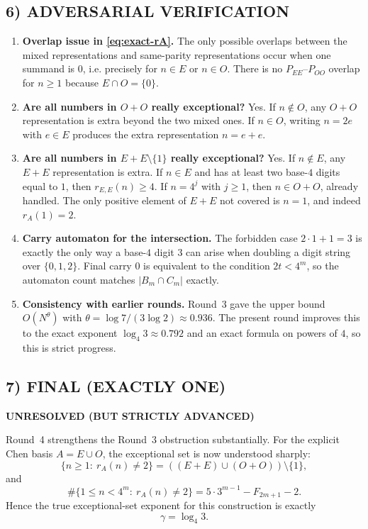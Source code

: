 \subsection*{6) ADVERSARIAL VERIFICATION}
\begin{enumerate}
\item \textbf{Overlap issue in \eqref{eq:exact-rA}.} The only possible overlaps between the mixed representations and same-parity representations occur when one summand is \(0\), i.e. precisely for \(n\in E\) or \(n\in O\). There is no \(P_{EE}\)--\(P_{OO}\) overlap for \(n\ge 1\) because \(E\cap O=\{0\}\).
\item \textbf{Are all numbers in \(O+O\) really exceptional?} Yes. If \(n\notin O\), any \(O+O\) representation is extra beyond the two mixed ones. If \(n\in O\), writing \(n=2e\) with \(e\in E\) produces the extra representation \(n=e+e\).
\item \textbf{Are all numbers in \(E+E\setminus\{1\}\) really exceptional?} Yes. If \(n\notin E\), any \(E+E\) representation is extra. If \(n\in E\) and has at least two base-\(4\) digits equal to \(1\), then \(r_{E,E}(n)\ge 4\). If \(n=4^j\) with \(j\ge 1\), then \(n\in O+O\), already handled. The only positive element of \(E+E\) not covered is \(n=1\), and indeed \(r_A(1)=2\).
\item \textbf{Carry automaton for the intersection.} The forbidden case \(2\cdot 1+1=3\) is exactly the only way a base-\(4\) digit \(3\) can arise when doubling a digit string over \(\{0,1,2\}\). Final carry \(0\) is equivalent to the condition \(2t<4^m\), so the automaton count matches \(|B_m\cap C_m|\) exactly.
\item \textbf{Consistency with earlier rounds.} Round~3 gave the upper bound \(O(N^\theta)\) with \(\theta=\log 7/(3\log 2)\approx 0.936\). The present round improves this to the exact exponent \(\log_4 3\approx 0.792\) and an exact formula on powers of \(4\), so this is strict progress.
\end{enumerate}

\subsection*{7) FINAL (EXACTLY ONE)}
\textbf{UNRESOLVED (BUT STRICTLY ADVANCED)}

Round~4 strengthens the Round~3 obstruction substantially. For the explicit Chen basis \(A=E\cup O\), the exceptional set is now understood sharply:
\[
\{n\ge 1:\ r_A(n)\ne 2\}=((E+E)\cup(O+O))\setminus\{1\},
\]
and
\[
\#\{1\le n<4^m:\ r_A(n)\ne 2\}=5\cdot 3^{m-1}-F_{2m+1}-2.
\]
Hence the true exceptional-set exponent for this construction is exactly
\[
\gamma=\log_4 3.
\]

